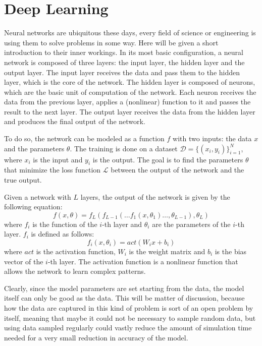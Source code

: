\section{Deep Learning}
\label{sec:neural_network}

Neural networks are ubiquitous these days, every field of science or engineering is using them to solve problems in some way. Here will be given a short introduction to their inner workings. 
In its most basic configuration, a neural network is composed of three layers: the input layer, the hidden layer and the output layer. The input layer receives the data and pass them to the hidden layer, which is the core of the network. The hidden layer is composed of neurons, which are the basic unit of computation of the network. Each neuron receives the data from the previous layer, applies a (nonlinear) function to it and passes the result to the next layer. The output layer receives the data from the hidden layer and produces the final output of the network. 

To do so, the network can be modeled as a function $f$ with two inputs: the data $x$ and the parameters $\theta$. The training is done on a dataset \(\mathcal{D} = \{(x_i, y_i)\}_{i=1}^N\), where \(x_i\) is the input and \(y_i\) is the output. The goal is to find the parameters \(\theta\) that minimize the loss function \(\mathcal{L}\) between the output of the network and the true output. 

Given a network with \(L\) layers, the output of the network is given by the following equation:
\begin{equation}
    f(x, \theta) = f_L(f_{L-1}(\ldots f_1(x, \theta_1) \ldots, \theta_{L-1}), \theta_L)
\end{equation}
where \(f_i\) is the function of the \(i\)-th layer and \(\theta_i\) are the parameters of the \(i\)-th layer. \(f_i\) is defined as follows:
\begin{equation}
    f_i(x, \theta_i) = act(W_i x + b_i)
\end{equation}
where \(act\) is the activation function, \(W_i\) is the weight matrix and \(b_i\) is the bias vector of the \(i\)-th layer. The activation function is a nonlinear function that allows the network to learn complex patterns. 

Clearly, since the model parameters are set starting from the data, the model itself can only be good as the data. This will be matter of discussion, because how the data are captured in this kind of problem is sort of an open problem by itself, meaning that maybe it could not be necessary to sample random data, but using data sampled regularly could vastly reduce the amount of simulation time needed for a very small reduction in accuracy of the model.